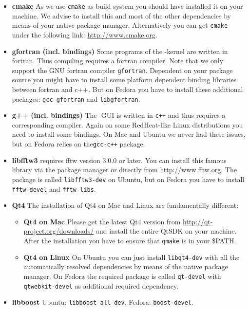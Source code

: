 \begin{itemize}
	\item \textbf{cmake} As we use \texttt{cmake} as build system you should have installed it on your machine. We advise to install this and most of the other dependencies by means of your native package manager. Alternatively you can get \texttt{cmake} under the following link: \url{http://www.cmake.org}.
	 
	\item \textbf{gfortran (incl. bindings)} Some programs of the {\twodx}-kernel are written in fortran. Thus compiling {\twodx} requires a fortran compiler. Note that we only support the GNU fortran compiler \texttt{gfortran}. Dependent on your package source you might have to install some platform dependent binding libraries between fortran and c++. But on Fedora you have to install these additional packages: \texttt{gcc-gfortran} and \texttt{libgfortran}.  
	
	\item \textbf{g++ (incl. bindings)} The {\twodx}-GUI is written in \texttt{c++} and thus requires a corresponding compiler. Again on some RedHeat-like Linux distributions you need to install some bindings. On Mac and Ubuntu we never had these issues, but on Fedora {\twodx} relies on the\texttt{gcc-c++} package.
	
	\item \textbf{libfftw3} {\twodx} requires fftw version 3.0.0 or later. You can install this famous library via the package manager or directly from \url{http://www.fftw.org}. The package is called \texttt{libfftw3-dev} on Ubuntu, but on Fedora you have to install \texttt{fftw-devel} and \texttt{fftw-libs}.

	\item \textbf{Qt4} The installation of Qt4 on Mac and Linux are fundamentally different:
		\begin{itemize}
			\item \textbf{Qt4 on Mac} Please get the latest Qt4 version from \url{http://qt-project.org/downloads/} and install the entire QtSDK on your machine. After the installation you have to ensure that \texttt{qmake} is in your \$PATH. 
			\item \textbf{Qt4 on Linux} On Ubuntu you can just install \texttt{libqt4-dev} with all the automatically resolved dependencies by means of the native package manager. On Fedora the required package is called \texttt{qt-devel} with \texttt{qtwebkit-devel} as additional required dependency.
		\end{itemize}
		
	\item \textbf{libboost} Ubuntu: \texttt{libboost-all-dev}, Fedora: \texttt{boost-devel}.
\end{itemize}

